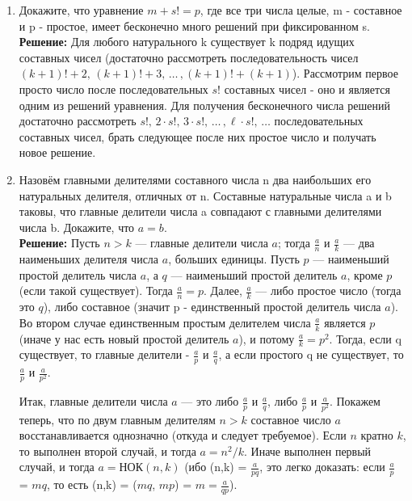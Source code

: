\documentclass[a4paper,12pt]{article}
\begin{document}
\begin{enumerate}[label=\textbf{Задача \arabic*.}]
Таким образом, $S(A_n) = S(B_n)$.

Заметим, что все множество чисел от 1 до 999999 разбивается на непересекающиеся пары $(A_1, B_1), (A_2, B_2), \dots, (A_{999}, B_{999})$. Поскольку в каждой паре суммы чисел равны, то и общие суммы для чисел с ближайшими четными и нечетными квадратами также равны.
\item Докажите, что уравнение $m + s! = p$, где все три числа целые, m - составное и p - простое, имеет бесконечно много решений при фиксированном s. \\
\textbf{Решение:} Для любого натурального k существует k подряд идущих составных чисел (достаточно рассмотреть последовательность чисел $(k+1)! + 2, \, (k+1)! + 3, \, \ldots \, , (k+1)! + (k+1)$). Рассмотрим первое просто число после последовательных $s!$ составных чисел - оно и является одним из решений уравнения. Для получения бесконечного числа решений достаточно рассмотреть $s!, \, 2\cdot s!, \, 3\cdot s!,\, \ldots \, ,\ell \cdot s!, \, \ldots$ последовательных составных чисел, брать следующее после них простое число и получать новое решение. 

\item Назовём главными делителями составного числа n два наибольших его натуральных делителя, отличных от n. Составные натуральные числа a и b таковы, что главные делители числа a совпадают с главными делителями числа b. Докажите, что $a = b$. \\
\textbf{Решение:} Пусть $n > k$ --- главные делители числа $a$; тогда $\frac{a}{n}$ и $\frac{a}{k}$ --- два наименьших делителя числа $a$, больших единицы. Пусть $p$ --- наименьший простой делитель числа $a$, а $q$ --- наименьший простой делитель $a$, кроме $p$ (если такой существует). Тогда $\frac{a}{n} = p$. Далее, $\frac{a}{k}$ --- либо простое число (тогда это $q$), либо составное (значит p - единственный простой делитель числа $a$). Во втором случае единственным простым делителем числа $\frac{a}{k}$ является $p$ (иначе у нас есть новый простой делитель $a$), и потому $\frac{a}{k} = p^2$. Тогда, если q существует, то главные делители - $\frac{a}{p}$ и $\frac{a}{q}$, а если простого q не существует, то $\frac{a}{p}$ и $\frac{a}{p^2}$.

Итак, главные делители числа $a$ --- это либо $\frac{a}{p}$ и $\frac{a}{q}$, либо $\frac{a}{p}$ и $\frac{a}{p^2}$. Покажем теперь, что по двум главным делителям $n > k$ составное число $a$ восстанавливается однозначно (откуда и следует требуемое). Если $n$ кратно $k$, то выполнен второй случай, и тогда $a = n^2/k$. Иначе выполнен первый случай, и тогда $a = \text{НОК}(n,k)$ (ибо (n,k) = $\frac{a}{pq}$, это легко доказать: если $\frac{a}{p}$ = $mq$, то есть (n,k) = ($mq$, $mp$) = $m = \frac{a}{qp}$).


\end{enumerate}
\end{document}
